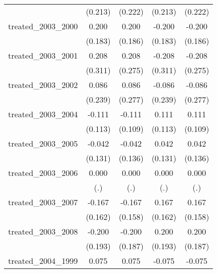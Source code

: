 {\begin{tabular}{l*{4}{c}}
            &     (0.213)         &     (0.222)         &     (0.213)         &     (0.222)         \\
[1em]
treated\_2003\_2000&       0.200         &       0.200         &      -0.200         &      -0.200         \\
            &     (0.183)         &     (0.186)         &     (0.183)         &     (0.186)         \\
[1em]
treated\_2003\_2001&       0.208         &       0.208         &      -0.208         &      -0.208         \\
            &     (0.311)         &     (0.275)         &     (0.311)         &     (0.275)         \\
[1em]
treated\_2003\_2002&       0.086         &       0.086         &      -0.086         &      -0.086         \\
            &     (0.239)         &     (0.277)         &     (0.239)         &     (0.277)         \\
[1em]
treated\_2003\_2004&      -0.111         &      -0.111         &       0.111         &       0.111         \\
            &     (0.113)         &     (0.109)         &     (0.113)         &     (0.109)         \\
[1em]
treated\_2003\_2005&      -0.042         &      -0.042         &       0.042         &       0.042         \\
            &     (0.131)         &     (0.136)         &     (0.131)         &     (0.136)         \\
[1em]
treated\_2003\_2006&       0.000         &       0.000         &       0.000         &       0.000         \\
            &         (.)         &         (.)         &         (.)         &         (.)         \\
[1em]
treated\_2003\_2007&      -0.167         &      -0.167         &       0.167         &       0.167         \\
            &     (0.162)         &     (0.158)         &     (0.162)         &     (0.158)         \\
[1em]
treated\_2003\_2008&      -0.200         &      -0.200         &       0.200         &       0.200         \\
            &     (0.193)         &     (0.187)         &     (0.193)         &     (0.187)         \\
[1em]
treated\_2004\_1999&       0.075         &       0.075         &      -0.075         &      -0.075         \\

\end{tabular}}

